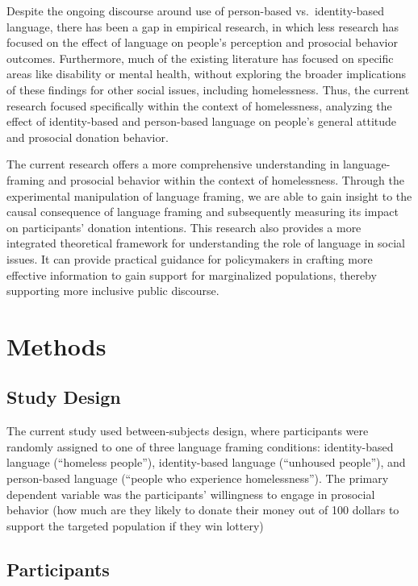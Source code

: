\documentclass[
  man]{apa6}
\begin{document}
Despite the ongoing discourse around use of person-based vs.~identity-based language, there has been a gap in empirical research, in which less research has focused on the effect of language on people's perception and prosocial behavior outcomes. Furthermore, much of the existing literature has focused on specific areas like disability or mental health, without exploring the broader implications of these findings for other social issues, including homelessness. Thus, the current research focused specifically within the context of homelessness, analyzing the effect of identity-based and person-based language on people's general attitude and prosocial donation behavior.

The current research offers a more comprehensive understanding in language-framing and prosocial behavior within the context of homelessness. Through the experimental manipulation of language framing, we are able to gain insight to the causal consequence of language framing and subsequently measuring its impact on participants' donation intentions. This research also provides a more integrated theoretical framework for understanding the role of language in social issues. It can provide practical guidance for policymakers in crafting more effective information to gain support for marginalized populations, thereby supporting more inclusive public discourse.

\hypertarget{methods}{%
\section{Methods}\label{methods}}

\hypertarget{study-design}{%
\subsection{Study Design}\label{study-design}}

The current study used between-subjects design, where participants were randomly assigned to one of three language framing conditions: identity-based language (``homeless people''), identity-based language (``unhoused people''), and person-based language (``people who experience homelessness''). The primary dependent variable was the participants' willingness to engage in prosocial behavior (how much are they likely to donate their money out of 100 dollars to support the targeted population if they win lottery)

\hypertarget{participants}{%
\subsection{Participants}\label{participants}}
\end{document}
